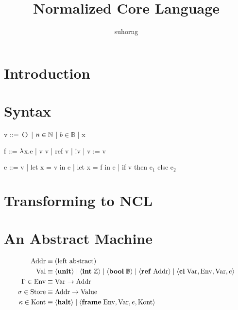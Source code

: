 \documentclass{article}
\begin{document}
\title{Normalized Core Language}
\author{suhorng}
\maketitle
\section{Introduction}
\section{Syntax}
\begin{minipage}{\textwidth}
\begin{minipage}[t]{0.33\textwidth}

\begin{code}
v  ::=  $\text{\texttt{()}}$
    |     $n\in\mathbb N$
    |     $b\in\mathbb{B}$
    |     x
\end{code}

\end{minipage}
\begin{minipage}[t]{0.33\textwidth}

\begin{code}
f  ::=  $\lambda$x.e
    |    v v
    |    ref v
    |    !v
    |    v := v
\end{code}

\end{minipage}
\begin{minipage}[t]{0.33\textwidth}

\begin{code}
e  ::=  v
    |    let x = v in e
    |    let x = f in e
    |    if v then e$_1$ else e$_2$
\end{code}

\end{minipage}
\end{minipage}
\section{Transforming to NCL}

\section{An Abstract Machine}
\[\begin{aligned}
\text{Addr} &\equiv (\text{left abstract})\\
\text{Val} &\equiv \langle\mathbf{unit}\rangle \;|\; \langle\mathbf{int}\; \mathbb Z\rangle \;|\; \langle\mathbf{bool}\; \mathbb{B}\rangle \;|\; \langle\mathbf{ref}\; \text{Addr}\rangle \;|\; \langle\mathbf{cl}\; \text{Var}, \text{Env}, \text{Var}, e\rangle\\
\Gamma \in \text{Env} &\equiv \text{Var} \to \text{Addr}\\
\sigma \in \text{Store} &\equiv \text{Addr} \to \text{Value} \\
\kappa \in \text{Kont} &\equiv \langle\mathbf{halt}\rangle \;|\; \langle\mathbf{frame}\; \text{Env}, \text{Var}, e, \text{Kont}\rangle
\end{aligned}\]
\end{document}
